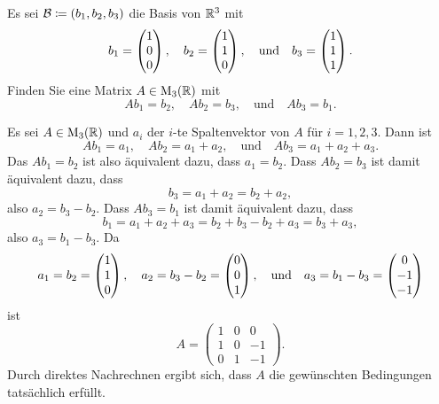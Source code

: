 \begin{question}
 Es sei $\mathcal{B} \coloneqq (b_1, b_2, b_3)$ die Basis von $\mathbb{R}^3$ mit
 \[
  b_1 = \begin{pmatrix}1 \\ 0 \\ 0\end{pmatrix}, \quad
  b_2 = \begin{pmatrix}1 \\ 1 \\ 0\end{pmatrix}, \quad
  \text{und} \quad
  b_3 = \begin{pmatrix}1 \\ 1 \\ 1\end{pmatrix}.
 \]
 Finden Sie eine Matrix $A \in \operatorname{M}_3(\mathbb{R})$ mit
 \[
  A b_1 = b_2, \quad
  A b_2 = b_3, \quad
  \text{und} \quad
  A b_3 = b_1.
 \]
\end{question}
\begin{solution}
 Es sei $A \in \operatorname{M}_3(\mathbb{R})$ und $a_i$ der $i$-te Spaltenvektor von $A$ für $i = 1, 2, 3$. Dann ist
 \[
  A b_1 = a_1, \quad
  A b_2 = a_1 + a_2, \quad
  \text{und} \quad
  A b_3 = a_1 + a_2 + a_3.
 \]
 Das $A b_1 = b_2$ ist also äquivalent dazu, dass $a_1 = b_2$. Dass  $A b_2 = b_3$ ist damit äquivalent dazu, dass \[
  b_3 = a_1 + a_2 = b_2 + a_2,
 \]
 also $a_2 = b_3 - b_2$. Dass $A b_3 = b_1$ ist damit äquivalent dazu, dass
 \[
  b_1 = a_1 + a_2 + a_3 = b_2 + b_3 - b_2 + a_3 = b_3 + a_3,
 \]
 also $a_3 =  b_1 - b_3$. Da
 \[
  a_1 = b_2 = \begin{pmatrix}1 \\ 1 \\ 0\end{pmatrix}, \quad
  a_2 = b_3 - b_2 = \begin{pmatrix}0 \\ 0 \\ 1\end{pmatrix}, \quad
  \text{und} \quad
  a_3 = b_1 - b_3 = \begin{pmatrix}0 \\ -1 \\ -1\end{pmatrix}
 \]
 ist
 \[
  A =
  \begin{pmatrix}
   1 & 0 &  0 \\
   1 & 0 & -1 \\
   0 & 1 & -1
  \end{pmatrix}.
 \]
 Durch direktes Nachrechnen ergibt sich, dass $A$ die gewünschten Bedingungen tatsächlich erfüllt.
 

\end{solution}

